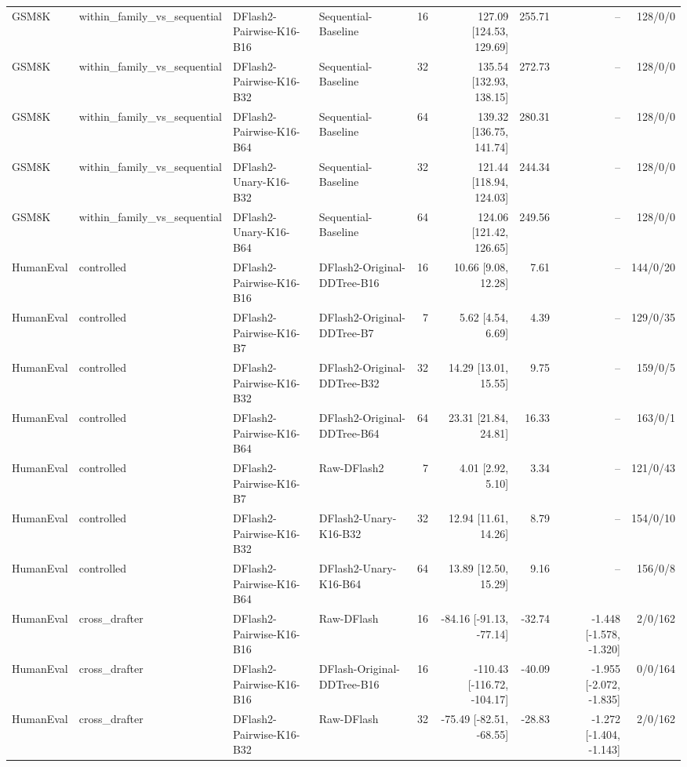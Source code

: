 \begin{longtable}{llllrrrrr}
GSM8K & within\_family\_vs\_sequential & DFlash2-Pairwise-K16-B16 & Sequential-Baseline & 16 & 127.09 [124.53, 129.69] & 255.71 & -- & 128/0/0 \\
GSM8K & within\_family\_vs\_sequential & DFlash2-Pairwise-K16-B32 & Sequential-Baseline & 32 & 135.54 [132.93, 138.15] & 272.73 & -- & 128/0/0 \\
GSM8K & within\_family\_vs\_sequential & DFlash2-Pairwise-K16-B64 & Sequential-Baseline & 64 & 139.32 [136.75, 141.74] & 280.31 & -- & 128/0/0 \\
GSM8K & within\_family\_vs\_sequential & DFlash2-Unary-K16-B32 & Sequential-Baseline & 32 & 121.44 [118.94, 124.03] & 244.34 & -- & 128/0/0 \\
GSM8K & within\_family\_vs\_sequential & DFlash2-Unary-K16-B64 & Sequential-Baseline & 64 & 124.06 [121.42, 126.65] & 249.56 & -- & 128/0/0 \\
HumanEval & controlled & DFlash2-Pairwise-K16-B16 & DFlash2-Original-DDTree-B16 & 16 & 10.66 [9.08, 12.28] & 7.61 & -- & 144/0/20 \\
HumanEval & controlled & DFlash2-Pairwise-K16-B7 & DFlash2-Original-DDTree-B7 & 7 & 5.62 [4.54, 6.69] & 4.39 & -- & 129/0/35 \\
HumanEval & controlled & DFlash2-Pairwise-K16-B32 & DFlash2-Original-DDTree-B32 & 32 & 14.29 [13.01, 15.55] & 9.75 & -- & 159/0/5 \\
HumanEval & controlled & DFlash2-Pairwise-K16-B64 & DFlash2-Original-DDTree-B64 & 64 & 23.31 [21.84, 24.81] & 16.33 & -- & 163/0/1 \\
HumanEval & controlled & DFlash2-Pairwise-K16-B7 & Raw-DFlash2 & 7 & 4.01 [2.92, 5.10] & 3.34 & -- & 121/0/43 \\
HumanEval & controlled & DFlash2-Pairwise-K16-B32 & DFlash2-Unary-K16-B32 & 32 & 12.94 [11.61, 14.26] & 8.79 & -- & 154/0/10 \\
HumanEval & controlled & DFlash2-Pairwise-K16-B64 & DFlash2-Unary-K16-B64 & 64 & 13.89 [12.50, 15.29] & 9.16 & -- & 156/0/8 \\
HumanEval & cross\_drafter & DFlash2-Pairwise-K16-B16 & Raw-DFlash & 16 & -84.16 [-91.13, -77.14] & -32.74 & -1.448 [-1.578, -1.320] & 2/0/162 \\
HumanEval & cross\_drafter & DFlash2-Pairwise-K16-B16 & DFlash-Original-DDTree-B16 & 16 & -110.43 [-116.72, -104.17] & -40.09 & -1.955 [-2.072, -1.835] & 0/0/164 \\
HumanEval & cross\_drafter & DFlash2-Pairwise-K16-B32 & Raw-DFlash & 32 & -75.49 [-82.51, -68.55] & -28.83 & -1.272 [-1.404, -1.143] & 2/0/162 \\

\end{longtable}
